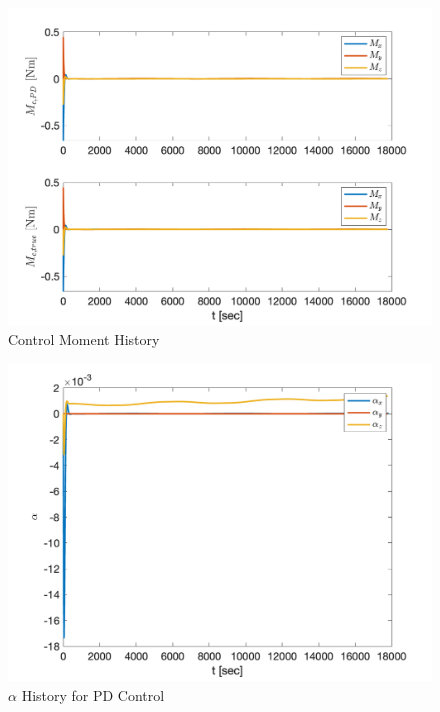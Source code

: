 \begin{figure}[H]
    \centering
    \captionsetup{ justification = centering }
    \includegraphics[width = 15cm]{Images/PS9/control_moment_history.png}
    \caption{Control Moment History}
    \label{fig:ControlMomentHistory}
\end{figure}

\begin{figure}[H]
    \centering
    \captionsetup{ justification = centering }
    \includegraphics[width = 15cm]{Images/PS9/alpha_history_PD_control.png}
    \caption{$\alpha$ History for PD Control}
    \label{fig:PDAlpha}
\end{figure}